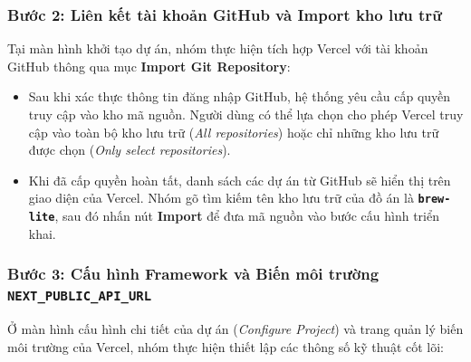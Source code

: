 \subsubsection{Bước 2: Liên kết tài khoản GitHub và Import kho lưu trữ}
Tại màn hình khởi tạo dự án, nhóm thực hiện tích hợp Vercel với tài khoản GitHub thông qua mục \textbf{Import Git Repository}:
\begin{itemize}
    \item Sau khi xác thực thông tin đăng nhập GitHub, hệ thống yêu cầu cấp quyền truy cập vào kho mã nguồn. Người dùng có thể lựa chọn cho phép Vercel truy cập vào toàn bộ kho lưu trữ (\textit{All repositories}) hoặc chỉ những kho lưu trữ được chọn (\textit{Only select repositories}).
    \item Khi đã cấp quyền hoàn tất, danh sách các dự án từ GitHub sẽ hiển thị trên giao diện của Vercel. Nhóm gõ tìm kiếm tên kho lưu trữ của đồ án là \textbf{\texttt{brew-lite}}, sau đó nhấn nút \textbf{Import} để đưa mã nguồn vào bước cấu hình triển khai.
\end{itemize}

\subsubsection{Bước 3: Cấu hình Framework và Biến môi trường \texttt{NEXT\_PUBLIC\_API\_URL}}
Ở màn hình cấu hình chi tiết của dự án (\textit{Configure Project}) và trang quản lý biến môi trường của Vercel, nhóm thực hiện thiết lập các thông số kỹ thuật cốt lõi:

